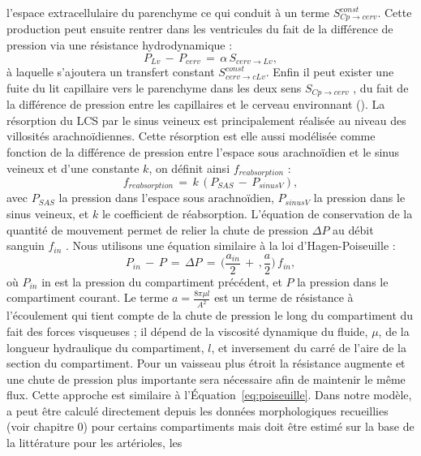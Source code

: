 l’espace extracellulaire du parenchyme ce qui conduit à un terme $S^{const}_{Cp\rightarrow cerv}$. Cette production peut
ensuite rentrer dans les ventricules du fait de la différence de pression via une résistance
hydrodynamique :
\begin{equation}
P_{Lv}\,-\,P_{cerv}\,=\,\alpha\,S_{cerv\rightarrow Lv},
\end{equation}
à laquelle s’ajoutera un transfert constant $S^{const}_{cerv\rightarrow cLv}$. Enfin il peut exister une fuite du lit capillaire
vers le parenchyme dans les deux sens $S_{Cp\rightarrow cerv}$ , du fait de la différence de pression entre les capillaires
et le cerveau environnant (\cite{Starling1896}). La résorption du LCS par le sinus veineux est principalement réalisée
au niveau des villosités arachnoïdiennes. Cette résorption est elle aussi modélisée comme fonction de
la différence de pression entre l’espace sous arachnoïdien et le sinus veineux et d’une constante $k$, on
définit ainsi $f_{reabsorption}$ :
\begin{equation}
f_{reabsorption}\,=\,k\,(P_{SAS}\,-\,P_{sinusV}),
\end{equation}
avec $P_{SAS}$ la pression dans l’espace sous arachnoïdien, $P_{sinusV}$ la pression dans le sinus veineux, et $k$
le coefficient de réabsorption.
L’équation de conservation de la quantité de mouvement permet de relier la chute de pression
$\Delta P$ au débit sanguin $f_{in}$ . Nous utilisons une équation similaire à la loi d’Hagen-Poiseuille :
\begin{equation}
\label{eq:flux}
P_{in}\,-\,P\,=\,\Delta P\,=\,\biggl(\frac{a_{in}}{2}\,+\,,\frac{a}{2}\biggr)\,f_{in},
\end{equation}
où $P_{in}$ in est la pression du compartiment précédent, et $P$ la pression dans le compartiment courant. Le
terme $a=\frac{8\pi \mu l}{A^2}$ est un terme de résistance à l’écoulement qui tient compte de la chute de pression le long du
compartiment du fait des forces visqueuses ; il dépend de la viscosité dynamique du fluide, $\mu$, de la
longueur hydraulique du compartiment, $l$, et inversement du carré de l’aire de la section du compartiment. Pour un
vaisseau plus étroit la résistance augmente et une chute de pression plus importante sera nécessaire
afin de maintenir le même flux. Cette approche est similaire à l’Équation~\ref{eq:poiseuille}. Dans notre modèle, a
peut être calculé directement depuis les données morphologiques recueillies (voir chapitre 0) pour
certains compartiments mais doit être estimé sur la base de la littérature pour les artérioles, les
